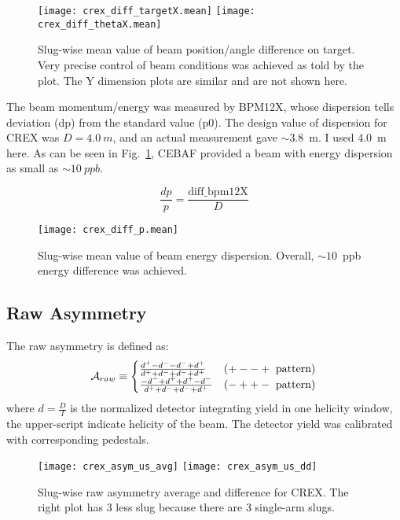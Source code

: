 \begin{figure}[H]
    \centering
    \texttt{[image: crex\_diff\_targetX.mean]}
    \texttt{[image: crex\_diff\_thetaX.mean]}
    \caption{Slug-wise mean value of beam position/angle difference on target. 
    Very precise control of beam conditions was achieved as told by the plot.
    The Y dimension plots are similar and are not shown here.}
\end{figure}


The beam momentum/energy was measured by BPM12X, whose dispersion tells deviation
(dp) from the standard value (p0). The design value of dispersion for CREX was
$D = 4.0\ m$, and an actual measurement gave $\sim3.8$~m. I used 4.0~m here.
As can be seen in Fig.~\ref{fig:crex_diff_p}, CEBAF provided a beam with energy 
dispersion as small as $\sim10\ ppb$.

\begin{equation}
    \frac{dp}{p} = \frac{\text{diff\_bpm12X}}{D}
\end{equation}

\begin{figure}[H]
    \centering
    \texttt{[image: crex\_diff\_p.mean]}
    \caption{Slug-wise mean value of beam energy dispersion. Overall, $\sim 10$~ppb 
    energy difference was achieved. }
    \label{fig:crex_diff_p}
\end{figure}

\subsection{Raw Asymmetry}
The raw asymmetry is defined as:
\begin{equation}
    \CA_{raw} \equiv 
    \begin{cases}
	\frac{d^+ - d^- - d^- + d^+}{d^+ + d^- + d^- + d^+}	& (+--+\ \text{pattern})    \\
	\frac{-d^- + d^+ + d^+ - d^-}{d^+ + d^- + d^- + d^+}	& (-++-\ \text{pattern})    \\
    \end{cases}
\end{equation}
where $d=\frac{D}{I}$ is the normalized detector integrating yield in one helicity
window, the upper-script indicate helicity of the beam. The detector yield was
calibrated with corresponding pedestals. 
\begin{figure}[H]
    \centering
    \texttt{[image: crex\_asym\_us\_avg]}
    \texttt{[image: crex\_asym\_us\_dd]}
    \caption{Slug-wise raw asymmetry average and difference for CREX. The right plot
    has 3 less slug because there are 3 single-arm slugs.}
\end{figure}

